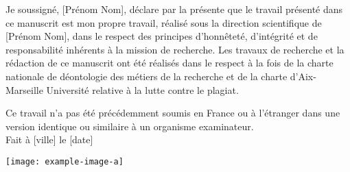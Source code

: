 \iftrue %
    Je soussigné, [Prénom Nom], %
    déclare par la présente que le travail présenté dans ce manuscrit est mon propre travail, réalisé sous la direction scientifique de [Prénom Nom], %
    dans le respect des principes d’honnêteté, d'intégrité et de responsabilité inhérents à la mission de recherche. Les travaux de recherche et la rédaction de ce manuscrit ont été réalisés dans le respect à la fois de la charte nationale de déontologie des métiers de la recherche et de la charte d’Aix-Marseille Université relative à la lutte contre le plagiat.
    
    Ce travail n'a pas été précédemment soumis en France ou à l'étranger dans une version identique ou similaire à un organisme examinateur.\\
    
    Fait à [ville] le [date]
    
    \begin{flushright}\texttt{[image: example-image-a]}\end{flushright}%
\fi

\iffalse %
    I, undersigned, [First Name Surname], %
    hereby declare that the work presented in this manuscript is my own work, carried out under the scientific direction of [First Name Surname], %
    in accordance with the principles of honesty, integrity and responsibility inherent to the research mission. The research work and the writing of this manuscript have been carried out in compliance with both the french national charter for Research Integrity and the Aix-Marseille University charter on the fight against plagiarism.
    
    This work has not been submitted previously either in this country or in aother country in the same or in a similar version to any other examination body.\\
    
    [Place] [date]
    
    \begin{flushright}\texttt{[image: example-image-b]}\texttt{[image: example-image-a]}\end{flushright} %
\fi


